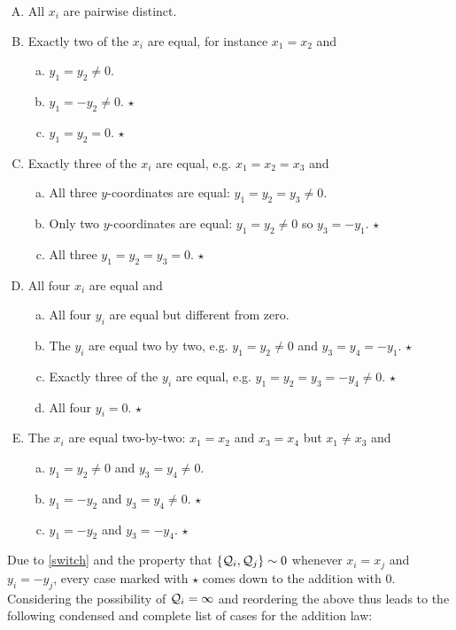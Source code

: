 \begin{enumerate}[A.]
	\parskip 1mm
	\item All $x_i$ are pairwise distinct.
	\item Exactly two of the $x_i$ are equal, for instance $x_1=x_2$ and
	\begin{enumerate}[a.]
		\item $y_1 = y_2 \neq 0$.
		\item $y_1 = -y_2 \neq 0$. \hfill $\star$
		\item $y_1=y_2=0$. \hfill $\star$
	\end{enumerate}
	\item Exactly three of the $x_i$ are equal, e.g. $x_1=x_2=x_3$ and
	\begin{enumerate}[a.]
		\item All three $y$-coordinates are equal: $y_1 = y_2 = y_3 \neq 0$.
		\item Only two $y$-coordinates are equal: $y_1 = y_2 \neq 0$ so $y_3=-y_1$. \hfill $\star$
		\item All three $y_1=y_2=y_3=0$. \hfill $\star$
	\end{enumerate}
	\item All four $x_i$ are equal and
	\begin{enumerate}[a.]
		\item All four $y_i$ are equal but different from zero.
		\item The $y_i$ are equal two by two, e.g. $y_1=y_2 \neq 0$ and $y_3=y_4 = -y_1$. \hfill $\star$
		\item Exactly three of the $y_i$ are equal, e.g. $y_1=y_2=y_3=-y_4 \neq 0$. \hfill $\star$
		\item All four $y_i=0$. \hfill $\star$
	\end{enumerate}
	\item The $x_i$ are equal two-by-two: $x_1=x_2$ and $x_3=x_4$ but $x_1 \neq x_3$ and
	\begin{enumerate}[a.]
		\item $y_1 = y_2 \neq 0$ and $y_3=y_4 \neq 0$.
		\item $y_1 = -y_2$ and $y_3=y_4 \neq 0$. \hfill $\star$
		\item $y_1 = -y_2$ and $y_3=-y_4$. \hfill $\star$
	\end{enumerate}
\end{enumerate}

Due to \eqref{switch} and the property that $\{ \mathcal{Q}_i, \mathcal{Q}_j \} \sim 0$ whenever $x_i=x_j$ and $y_i = -y_j$, every case marked with $\star$ comes down to the addition with 0. Considering the possibility of $\mathcal{Q}_i = \infty$ and reordering the above thus leads to the following condensed and complete list of cases for the addition law:

